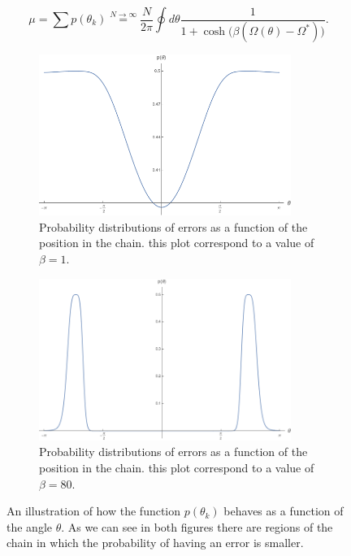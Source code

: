 \begin{equation}
\mu = \sum p(\theta_k) \stackrel{N\to \infty}{=}\frac{N}{2\pi}\oint d\theta \frac{1}{1+\cosh{(\beta(\Omega(\theta)-\Omega^*)})}.
   \label{CH3:average_of_errors}
\end{equation}
\begin{figure}[H]
\centering
\begin{subfigure}[b]{0.45\textwidth}
    \centering
    \includegraphics[width = 0.9\textwidth]{Figures/beta_1.png}
    \caption{Probability distributions of errors as a function of the position in the chain. this plot correspond to a value of $\beta=1$.}
    \label{beta1}
\end{subfigure}
\hfill
\begin{subfigure}[b]{0.45\textwidth}
    \centering
    \includegraphics[width = 0.9\textwidth]{Figures/beta_80.png}
    \caption{Probability distributions of errors as a function of the position in the chain. this plot correspond to a value of $\beta=80$.}
    \label{beta80}
\end{subfigure}
\caption{An illustration of how the function $p(\theta_k)$ behaves as a function of the angle $\theta$. As we can see in both figures there are regions of the chain in which the probability of having an error is smaller.}
       \label{fig:three graphs}
\end{figure}
